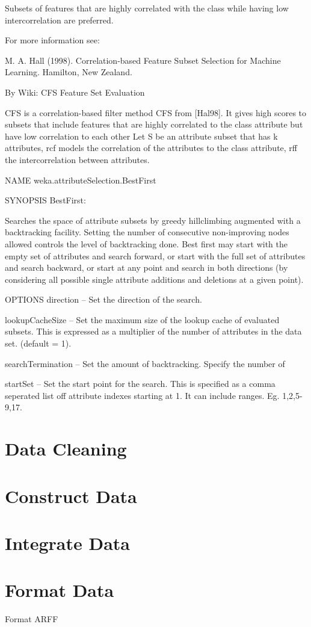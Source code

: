 Subsets of features that are highly correlated with the class while having low intercorrelation are preferred.

For more information see:

M. A. Hall (1998). Correlation-based Feature Subset Selection for Machine Learning. Hamilton, New Zealand.



By Wiki:
CFS Feature Set Evaluation

CFS is a correlation-based filter method CFS from [Hal98]. It gives high scores to subsets that include features
that are highly correlated to the class attribute but have low correlation to each other Let S be an attribute
subset that has k attributes, rcf models the correlation of the attributes to the class attribute, rff the
intercorrelation between attributes.


NAME
weka.attributeSelection.BestFirst

SYNOPSIS
BestFirst:

Searches the space of attribute subsets by greedy hillclimbing augmented with a backtracking facility. Setting the number of consecutive non-improving nodes allowed controls the level of backtracking done. Best first may start with the empty set of attributes and search forward, or start with the full set of attributes and search backward, or start at any point and search in both directions (by considering all possible single attribute additions and deletions at a given point).


OPTIONS
direction -- Set the direction of the search.

lookupCacheSize -- Set the maximum size of the lookup cache of evaluated subsets. This is expressed as a multiplier of the number of attributes in the data set. (default = 1).

searchTermination -- Set the amount of backtracking. Specify the number of 

startSet -- Set the start point for the search. This is specified as a comma seperated list off attribute indexes starting at 1. It can include ranges. Eg. 1,2,5-9,17.

\section{Data Cleaning}

\section{Construct Data}

\section{Integrate Data}

\section{Format Data}
Format ARFF
